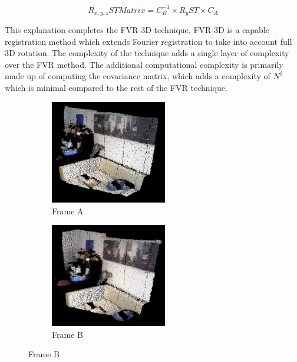 \begin{equation} \label{eqn:FullRSTTransform}
R_{x,y,z}ST Matrix = C_{B}^{-1} \times R_{y}ST \times C_A
\end{equation}

This explanation completes the FVR-3D technique. FVR-3D is a capable registration method which extends Fourier registration to take into account full 3D rotation. The complexity of the technique adds a single layer of complexity over the FVR method. The additional computational complexity is primarily made up of computing the covariance matrix, which adds a complexity of $N^3$ which is minimal compared to the rest of the FVR technique. \\


\begin{figure}[!htb] 
        \centering
        \begin{subfigure}[b]{3.0in}
               \centering
                \includegraphics[width=2.0in]{images/methodology/FVR/fvr3d/frameA}
                \caption{Frame A}
                \label{fig:fvr3DINA}
        \end{subfigure}%
        \begin{subfigure}[b]{3.0in}
        		\centering
                \includegraphics[width=2.0in]{images/methodology/FVR/fvr3d/frameB}
                \caption{Frame B}
                \label{fig:fvr3DINB}
        \end{subfigure}
        

\end{figure}
